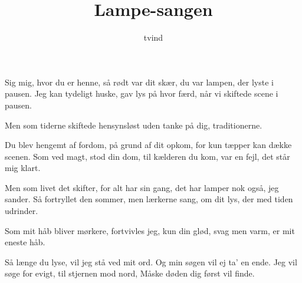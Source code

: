 \documentclass{article}
\title{Lampe-sangen}
\author{tvind}
\begin{document}
\maketitle{}
\Large
\begin{song}
Sig mig, hvor du er henne, så rødt var dit skær,
du var lampen, der lyste i pausen.
Jeg kan tydeligt huske, gav lys på hvor færd,
når vi skiftede scene i pausen.

Men som tiderne skiftede hensynsløst
uden tanke på dig, traditionerne.

Du blev hengemt af fordom, på grund af dit opkom,
for kun tæpper kan dække scenen.
Som ved magt, stod din dom, til kælderen du kom,
var en fejl, det står mig klart.

Men som livet det skifter, for alt har sin gang,
det har lamper nok også, jeg sander.
Så fortryllet den sommer, men lærkerne sang,
om dit lys, der med tiden udrinder.

Som mit håb bliver mørkere, fortvivles jeg,
kun din glød, svag men varm, er mit eneste håb.

Så længe du lyse, vil jeg stå ved mit ord.
Og min søgen vil ej ta' en ende.
Jeg vil søge for evigt, til stjernen mod nord,
Måske døden dig først vil finde.
\end{song}
\end{document}

